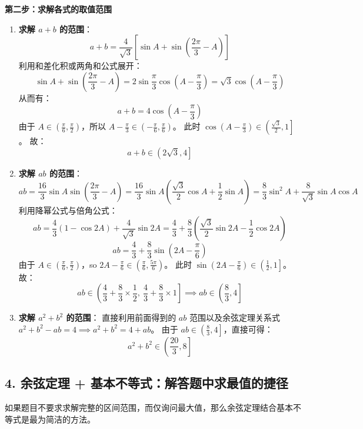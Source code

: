 \documentclass[11pt, a4paper]{ctexart}
\begin{document}
\textbf{第二步：求解各式的取值范围}
\begin{enumerate}
  \item \textbf{求解 $a+b$ 的范围}：
    \[
    a+b = \frac{4}{\sqrt{3}}\left[ \sin A + \sin\left(\frac{2\pi}{3} - A\right) \right]
    \]
    利用和差化积或两角和公式展开：
    \[
    \sin A + \sin\left(\frac{2\pi}{3} - A\right) = 2\sin\frac{\pi}{3}\cos\left(A - \frac{\pi}{3}\right) = \sqrt{3}\cos\left(A - \frac{\pi}{3}\right)
    \]
    从而有：
    \[
    a+b = 4\cos\left(A - \frac{\pi}{3}\right)
    \]
    由于 $A \in \left(\frac{\pi}{6}, \frac{\pi}{2}\right)$，所以 $A - \frac{\pi}{3} \in \left(-\frac{\pi}{6}, \frac{\pi}{6}\right)$。
    此时 $\cos\left(A - \frac{\pi}{3}\right) \in \left(\frac{\sqrt{3}}{2}, 1\right]$。
    故：
    \[
    a+b \in \left(2\sqrt{3}, 4\right]
    \]

  \item \textbf{求解 $ab$ 的范围}：
    \[
    ab = \frac{16}{3}\sin A\sin\left(\frac{2\pi}{3} - A\right) = \frac{16}{3}\sin A\left(\frac{\sqrt{3}}{2}\cos A + \frac{1}{2}\sin A\right) = \frac{8}{3}\sin^2 A + \frac{8}{\sqrt{3}}\sin A\cos A
    \]
    利用降幂公式与倍角公式：
    \[
    ab = \frac{4}{3}(1 - \cos 2A) + \frac{4}{\sqrt{3}}\sin 2A = \frac{4}{3} + \frac{8}{3}\left(\frac{\sqrt{3}}{2}\sin 2A - \frac{1}{2}\cos 2A\right)
    \]
    \[
    ab = \frac{4}{3} + \frac{8}{3}\sin\left(2A - \frac{\pi}{6}\right)
    \]
    由于 $A \in \left(\frac{\pi}{6}, \frac{\pi}{2}\right)$，so $2A - \frac{\pi}{6} \in \left(\frac{\pi}{6}, \frac{5\pi}{6}\right)$。
    此时 $\sin\left(2A - \frac{\pi}{6}\right) \in \left(\frac{1}{2}, 1\right]$。
    故：
    \[
    ab \in \left(\frac{4}{3} + \frac{8}{3} \times \frac{1}{2}, \ \frac{4}{3} + \frac{8}{3} \times 1\right] \implies ab \in \left(\frac{8}{3}, 4\right]
    \]

  \item \textbf{求解 $a^2+b^2$ 的范围}：
    直接利用前面得到的 $ab$ 范围以及余弦定理关系式 $a^2+b^2 - ab = 4 \implies a^2+b^2 = 4 + ab$。
    由于 $ab \in \left(\frac{8}{3}, 4\right]$，直接可得：
    \[
    a^2+b^2 \in \left(\frac{20}{3}, 8\right]
    \]
\end{enumerate}

\subsection{4. 余弦定理 + 基本不等式：解答题中求最值的捷径}
如果题目不要求求解完整的区间范围，而仅询问最大值，那么余弦定理结合基本不等式是最为简洁的方法。
\end{document}

